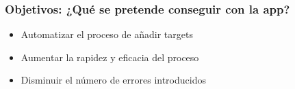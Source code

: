 \begin{frame}[label=objetivos]
    \frametitle{Objetivos: ¿Qué se pretende conseguir con la app?}
    \begin{itemize}
        \item Automatizar el proceso de añadir targets
        \item Aumentar la rapidez y eficacia del proceso
        \item Disminuir el número de errores introducidos
    \end{itemize}
    
\end{frame}